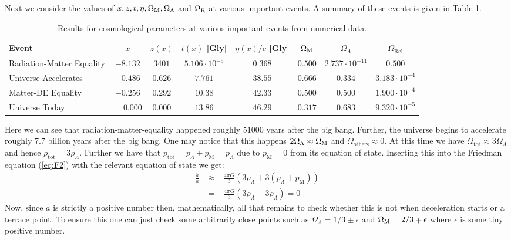 \documentclass[%
reprint,
 amsmath,amssymb,
 aps,
]{revtex4-2}
\begin{document}
Next we consider the values of $x,z,t,\eta,\Omega_\text M, \Omega_\Lambda$ and $\Omega_\text R$ at various important events. A summary of these events is given in Table \ref{tab:cosmo_events}.
\renewcommand{\arraystretch}{1.25}
\begin{table}[ht!] %
	\caption{Results for cosmological parameters at various important events from numerical data.}
	\begin{tabular}{|l|c|c|c|c|c|c|c|}
		\hline
		Event & $x$ & $z(x)$ & $t(x)$ [Gly] & $\eta(x)/c$ [Gly] & $\Omega_\text M$ & $\Omega_{\Lambda}$ & $\Omega_{\text{Rel}}$ \\
		\hline
		Radiation-Matter Equality  & $-8.132$ & $3401$ & $5.106 \cdot 10^{-5}$ & $0.368$ & $0.500$ & $2.737 \cdot 10^{-11}$ & $0.500$ \\
		\hline
		Universe Accelerates & $-0.486$ & $0.626$ & $7.761$ & $38.55$ & $0.666$ & $0.334$ & $3.183\cdot10^{-4}$ \\
		\hline
		Matter-DE Equality & $-0.256$ & $0.292$ & $10.38$ & $42.33$ & $0.500$ & $0.500$ & $1.900\cdot10^{-4}$ \\
		\hline
		Universe Today & $\phantom{-}0.000 $ & $0.000 $ & $13.86$ & $46.29$ & $0.317$ & $0.683$ & $9.320 \cdot 10^{-5}$ \\
		\hline
	\end{tabular}
	\label{tab:cosmo_events}
\end{table}

Here we can see that radiation-matter-equality happened roughly $51000$ years after the big bang. Further, the universe begins to accelerate roughly 7.7 billion years after the big bang. One may notice that this happens $2\Omega_{\Lambda}\approx\Omega_{\text M}$ and $\Omega_{\text{others}}\approx0$. At this time we have $\Omega_{\text{tot}}\approx3\Omega_{\Lambda}$ and hence $\rho_\text{tot}=3\rho_\Lambda$. Further we have that $p_\text{tot}=p_\Lambda+p_\text{M}=p_\Lambda$ due to $p_\text{M}=0$ from its equation of state. Inserting this into the Friedman equation (\ref{eq:F2}) with the relevant equation of state we get:
\begin{align*}
	\frac{\ddot{a}}{a}&\approx -\frac{4\pi G}{3}(3\rho_\Lambda+3(p_\Lambda+p_\text{M}))\\
	&=-\frac{4\pi G}{3}(3\rho_\Lambda-3\rho_\Lambda)=0
\end{align*}
Now, since $a$ is strictly a positive number then, mathematically, all that remains to check whether this is not when deceleration starts or a terrace point. To ensure this one can just check some arbitrarily close points such as $\Omega_{\Lambda}=1/3\pm\epsilon$ and $\Omega_{\text M}=2/3\mp\epsilon$ where $\epsilon$ is some tiny positive number.
\end{document}
